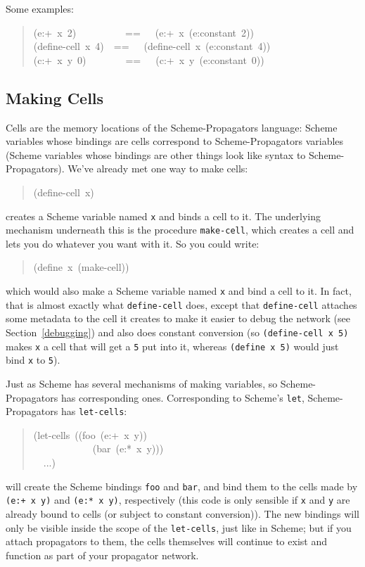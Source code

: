 \documentclass[12pt,letterpaper,english]{article}
\begin{document}
Some examples:
\begin{quote}{\ttfamily \raggedright \noindent
(e:+~x~2)~~~~~~~~~~==~~~(e:+~x~(e:constant~2))~\\
(define-cell~x~4)~~==~~~(define-cell~x~(e:constant~4))~\\
(c:+~x~y~0)~~~~~~~~==~~~(c:+~x~y~(e:constant~0))
}\end{quote}



\hypertarget{making-cells}{}
\subsection{Making Cells}
\label{making-cells}

Cells are the memory locations of the Scheme-Propagators
language: Scheme variables whose bindings are cells correspond to
Scheme-Propagators variables (Scheme variables whose bindings are
other things look like syntax to Scheme-Propagators).  We've
already met one way to make cells:
\begin{quote}{\ttfamily \raggedright \noindent
(define-cell~x)
}\end{quote}
creates a Scheme variable named \texttt{x} and binds a cell to it.  The
underlying mechanism underneath this is the procedure \texttt{make-cell},
which creates a cell and lets you do whatever you want with it.  So
you could write:
\begin{quote}{\ttfamily \raggedright \noindent
(define~x~(make-cell))
}\end{quote}
which would also make a Scheme variable named \texttt{x} and bind a cell to
it.  In fact, that is almost exactly what \texttt{define-cell} does, except
that \texttt{define-cell} attaches some metadata to the cell it creates to
make it easier to debug the network (see Section~\ref{debugging})
and also does constant
conversion (so \texttt{(define-cell x 5)} makes \texttt{x} a cell that will get
a \texttt{5} put into it, whereas \texttt{(define x 5)} would just bind \texttt{x} to
\texttt{5}).

Just as Scheme has several mechanisms of making variables, so
Scheme-Propagators has corresponding ones.  Corresponding to Scheme's
\texttt{let}, Scheme-Propagators has \texttt{let-cells}:
\begin{quote}{\ttfamily \raggedright \noindent
(let-cells~((foo~(e:+~x~y))~\\
~~~~~~~~~~~~(bar~(e:*~x~y)))~\\
~~...)
}\end{quote}
will create the Scheme bindings \texttt{foo} and \texttt{bar}, and bind them to
the cells made by \texttt{(e:+ x y)} and \texttt{(e:* x y)}, respectively (this
code is only sensible if \texttt{x} and \texttt{y} are already bound to cells
(or subject to constant conversion)).  The new bindings will only be
visible inside the scope of the \texttt{let-cells}, just like in Scheme;
but if you attach propagators to them, the cells themselves will
continue to exist and function as part of your propagator network.
\end{document}
